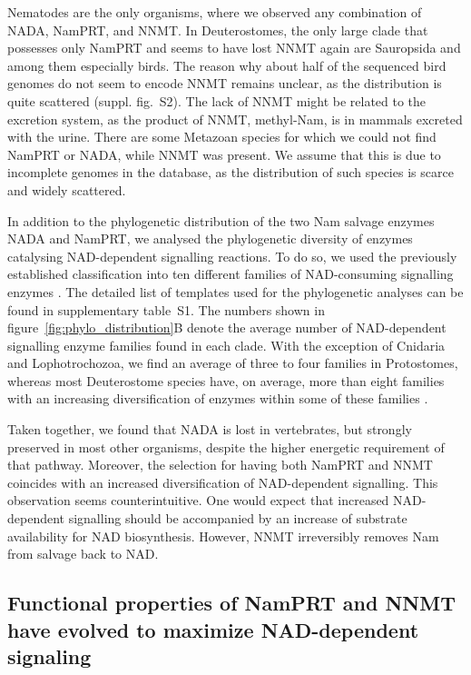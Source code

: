 Nematodes are the only organisms, where we observed any combination of NADA, NamPRT, and NNMT. In Deuterostomes, the only large clade that possesses only NamPRT and seems to have lost NNMT again are Sauropsida and among them especially birds. The reason why about half of the sequenced bird genomes do not seem to encode NNMT remains unclear, as the distribution is quite scattered (suppl. fig.~S2). The lack of NNMT might be related to the excretion system, as the product of NNMT, methyl-Nam, is in mammals excreted with the urine. There are some Metazoan species for which we could not find NamPRT or NADA, while NNMT was present. We assume that this is due to incomplete genomes in the database, as the distribution of such species is scarce and widely scattered.

In addition to the phylogenetic distribution of the two Nam salvage enzymes NADA and NamPRT, we analysed the phylogenetic diversity of enzymes catalysing NAD-dependent signalling reactions. To do so, we used the previously established classification into ten different families of NAD-consuming signalling enzymes \cite{Gossmann2012FEBS}. The detailed list of templates used for the phylogenetic analyses can be found in supplementary table~S1. The numbers shown in figure~\ref{fig:phylo_distribution}B denote the average number of NAD-dependent signalling enzyme families found in each clade. With the exception of Cnidaria and Lophotrochozoa, we find an average of three to four families in Protostomes, whereas most Deuterostome species have, on average, more than eight families with an increasing diversification of enzymes within some of these families \cite{Gossmann2014DNAR}.

Taken together, we found that NADA is lost in vertebrates, but strongly preserved in most other organisms, despite the higher energetic requirement of that pathway. Moreover, the selection for having both NamPRT and NNMT coincides with an increased diversification of NAD-dependent signalling. This observation seems counterintuitive. One would expect that increased NAD-dependent signalling should be accompanied by an increase of substrate availability for NAD biosynthesis. However, NNMT irreversibly removes Nam from salvage back to NAD.


\subsection{Functional properties of NamPRT and NNMT have evolved to maximize NAD-dependent signaling}


